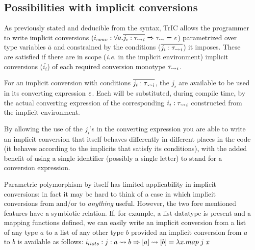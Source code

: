 \subsection{Possibilities with implicit conversions}
As previously stated and deducible from the syntax, TrIC allows the programmer to write implicit conversions ($i_{conv} : \forall \overline{a}.\overline{j_i : \mathit{\tau_{\rightsquigarrow}}_i} \Rightarrow \mathit{\tau_{\rightsquigarrow}} = \mathit{e}$) parametrized over type variables $\overline{a}$  and constrained by the conditions ($\overline{j_i : \mathit{\tau_{\rightsquigarrow}}_i}$) it imposes. These are satisfied if there are in scope (\textit{i.e.} in the implicit environment) implicit conversions ($\overline{i_i}$) of each required conversion monotype $\mathit{\tau_{\rightsquigarrow}}_i$.

For an implicit conversion with conditions $\overline{j_i : \mathit{\tau_{\rightsquigarrow}}_i}$, the $\overline{j_i}$ are available to be used in its converting expression $\mathit{e}$. Each will be substituted, during compile time, by the actual converting expression of the corresponding $i_i:\mathit{\tau_{\rightsquigarrow}}_i$ constructed from the implicit environment.

By allowing the use of the $j_i$'s in the converting expression you are able to write an implicit conversion that itself behaves differently in different places in the code (it behaves according to the implicits that satisfy its conditions), with the added benefit of using a single identifier (possibly a single letter) to stand for a conversion expression.

Parametric polymorphism by itself has limited applicability in implicit conversions: in fact it may be hard to think of a case in which implicit conversions from and/or to \textit{anything} useful. However, the two fore mentioned features have a symbiotic relation. If, for example, a list datatype is present and a mapping functions defined, we can easily write an implicit conversion from a list of any type $a$ to a list of any other type $b$ provided an implicit conversion from $a$ to $b$ is available as follows: $i_{lists}: j: a \rightsquigarrow b \Rightarrow [a] \rightsquigarrow [b] = \lambda \mathit{x} . map\;j\;\mathit{x}$

